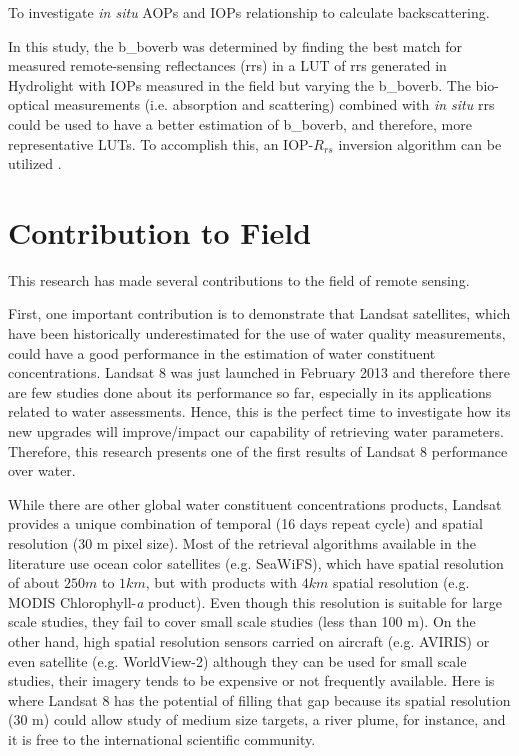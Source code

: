\begin{enumerate}
			{\bf \item To investigate {\it in situ} AOPs and IOPs relationship to calculate backscattering.}

In this study, the \gls{b_boverb} was determined by finding the best match for measured remote-sensing reflectances (\acrshort{rrs}) in a LUT of \gls{rrs} generated in Hydrolight with IOPs measured in the field but varying the \gls{b_boverb}. The bio-optical measurements (i.e. absorption and scattering) combined with {\it in situ} \gls{rrs} could be used to have a better estimation of \gls{b_boverb}, and therefore, more representative LUTs. To accomplish this, an IOP-$R_{rs}$ inversion algorithm can be utilized \citep{Morel:1977rw,Lee2002_invQAA,Werdell2013_inv}.	

	\end{enumerate}	

		
\vspace{-0.5cm}
\section{Contribution to Field}
\label{sec:contributiontofield}
This research has made several contributions to the field of remote sensing.

First, one important contribution is to demonstrate that Landsat satellites, which have been historically underestimated for the use of water quality measurements, could have a good performance in the estimation of water constituent concentrations. Landsat 8 was just launched in February 2013 and therefore there are few studies done about its performance so far, especially in its applications related to water assessments. Hence, this is the perfect time to investigate how its new upgrades will improve/impact our capability of retrieving water parameters. Therefore, this research presents one of the first results of Landsat 8 performance over water.  

While there are other global water constituent concentrations products, Landsat provides a unique combination of temporal (16 days repeat cycle) and spatial resolution (30 m pixel size). Most of the retrieval algorithms available in the literature use ocean color satellites (e.g. SeaWiFS), which have spatial resolution of about $250 m$ to $1 km$, but with products with $4km$ spatial resolution (e.g. MODIS Chlorophyll-{\it a} product). Even though this resolution is suitable for large scale studies, they fail to cover small scale studies (less than 100 m). On the other hand, high spatial resolution sensors carried on aircraft (e.g. AVIRIS) or even satellite (e.g. WorldView-2) although they can be used for small scale studies, their imagery tends to be expensive or not frequently available. Here is where Landsat 8 has the potential of filling that gap because its spatial resolution (30 m) could allow study of medium size targets, a river plume, for instance, and it is free to the international scientific community.

